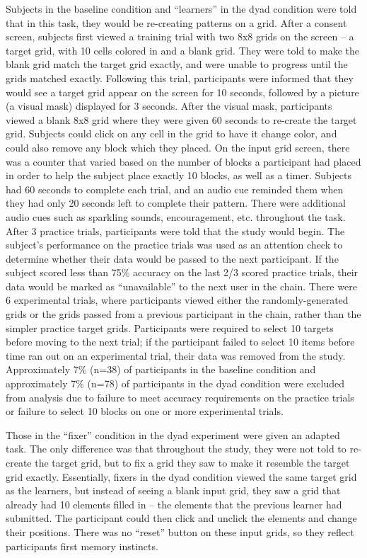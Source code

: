 \documentclass[10pt, letterpaper]{article}
\begin{document}
Subjects in the baseline condition and ``learners'' in the dyad
condition were told that in this task, they would be re-creating
patterns on a grid. After a consent screen, subjects first viewed a
training trial with two 8x8 grids on the screen -- a target grid, with
10 cells colored in and a blank grid. They were told to make the blank
grid match the target grid exactly, and were unable to progress until
the grids matched exactly. Following this trial, participants were
informed that they would see a target grid appear on the screen for 10
seconds, followed by a picture (a visual mask) displayed for 3 seconds.
After the visual mask, participants viewed a blank 8x8 grid where they
were given 60 seconds to re-create the target grid. Subjects could click
on any cell in the grid to have it change color, and could also remove
any block which they placed. On the input grid screen, there was a
counter that varied based on the number of blocks a participant had
placed in order to help the subject place exactly 10 blocks, as well as
a timer. Subjects had 60 seconds to complete each trial, and an audio
cue reminded them when they had only 20 seconds left to complete their
pattern. There were additional audio cues such as sparkling sounds,
encouragement, etc. throughout the task. After 3 practice trials,
participants were told that the study would begin. The subject's
performance on the practice trials was used as an attention check to
determine whether their data would be passed to the next participant. If
the subject scored less than 75\% accuracy on the last 2/3 scored
practice trials, their data would be marked as ``unavailable'' to the
next user in the chain. There were 6 experimental trials, where
participants viewed either the randomly-generated grids or the grids
passed from a previous participant in the chain, rather than the simpler
practice target grids. Participants were required to select 10 targets
before moving to the next trial; if the participant failed to select 10
items before time ran out on an experimental trial, their data was
removed from the study. Approximately 7\% (n=38) of participants in the
baseline condition and approximately 7\% (n=78) of participants in the
dyad condition were excluded from analysis due to failure to meet
accuracy requirements on the practice trials or failure to select 10
blocks on one or more experimental trials.

Those in the ``fixer'' condition in the dyad experiment were given an
adapted task. The only difference was that throughout the study, they
were not told to re-create the target grid, but to fix a grid they saw
to make it resemble the target grid exactly. Essentially, fixers in the
dyad condition viewed the same target grid as the learners, but instead
of seeing a blank input grid, they saw a grid that already had 10
elements filled in -- the elements that the previous learner had
submitted. The participant could then click and unclick the elements and
change their positions. There was no ``reset'' button on these input
grids, so they reflect participants first memory instincts.
\end{document}
